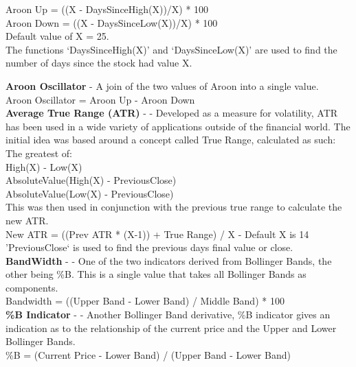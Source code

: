 \documentclass[conference]{IEEEtran}
\begin{document}
\noindent
Aroon Up = ((X - DaysSinceHigh(X))/X) * 100\\
Aroon Down = ((X - DaysSinceLow(X))/X) * 100\\
Default value of X = 25.\\

The functions `DaysSinceHigh(X)' and `DaysSinceLow(X)' are used to find the number of days since the stock had value X.

\noindent
\textbf{Aroon Oscillator} - A join of the two values of Aroon into a single value.\\
\noindent
Aroon Oscillator = Aroon Up - Aroon Down\\

\noindent
\textbf{Average True Range (ATR)} - \cite{Wilder1978} - Developed as a measure for volatility, ATR has been used in a wide variety of applications outside of the financial world. The initial idea was based around a concept called True Range, calculated as such:\\

\noindent
The greatest of:\\
High(X) - Low(X)\\
AbsoluteValue(High(X) - PreviousClose)\\
AbsoluteValue(Low(X) - PreviousClose)\\

\noindent
This was then used in conjunction with the previous true range to calculate the new ATR.\\

\noindent
New ATR = ((Prev ATR * (X-1)) + True Range) / X - Default X is 14 \\

'PreviousClose` is used to find the previous days final value or close.\\

\noindent
\textbf{BandWidth} - \cite{Murphy1999} - One of the two indicators derived from Bollinger Bands, the other being \%B. This is a single value that takes all Bollinger Bands as components.\\
\noindent
Bandwidth = ((Upper Band - Lower Band) / Middle Band) * 100 \\

\noindent
\textbf{\%B Indicator} - \cite{Murphy1999} - Another Bollinger Band derivative, \%B indicator gives an indication as to the relationship of the current price and the Upper and Lower Bollinger Bands. \\
\noindent
\%B = (Current Price - Lower Band) / (Upper Band - Lower Band)\\
\end{document}
